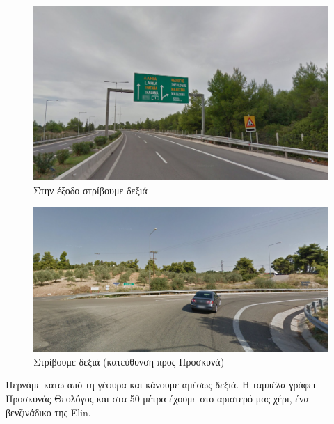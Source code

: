 \begin{figure}[hbp!]
	\centering
		\includegraphics[width=\textwidth]{images/athina-lamia/tragana/tragana1.PNG}
			\caption{Στην έξοδο στρίβουμε δεξιά}
	
\end{figure}
\begin{figure}[hbp!]
	\centering
		\includegraphics[width=\textwidth]{images/athina-lamia/tragana/tragana2.PNG}
			\caption{Στρίβουμε δεξιά (κατεύθυνση προς Προσκυνά)}
\end{figure}
\break			
Περνάμε κάτω από τη γέφυρα και κάνουμε αμέσως δεξιά. Η ταμπέλα γράφει Προσκυνάς-Θεολόγος και στα 50 μέτρα έχουμε στο αριστερό μας χέρι, ένα βενζινάδικο της Elin.

